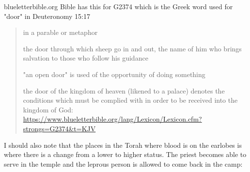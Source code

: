 \documentclass[11pt]{article}
\begin{document}
blueletterbible.org Bible has this for G2374 which is the Greek word used for "door" in Deuteronomy 15:17
\begin{quote}
in a parable or metaphor

the door through which sheep go in and out, the name of him who brings salvation to those who follow his guidance

"an open door" is used of the opportunity of doing something

the door of the kingdom of heaven (likened to a palace) denotes the conditions which must be complied with in order to be received into the kingdom of God:
\url{https://www.blueletterbible.org/lang/Lexicon/Lexicon.cfm?strongs=G2374&t=KJV}
\end{quote}


I should also note that the places in the Torah where blood is on the earlobes is where there is a change from a lower to higher status. The priest becomes able to serve in the temple and the leprous person is allowed to come back in the camp:
\end{document}
